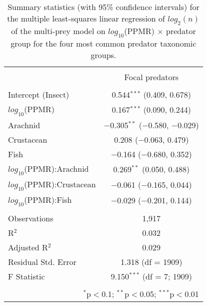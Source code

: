 
\begin{table}[!htbp] \centering 
  \caption{Summary statistics (with 95\% confidence intervals) for the multiple least-squares linear regression of $log_2(n)$ of the multi-prey model on $log_{10}$(PPMR) $\times$ predator group for the four most common predator taxonomic groups.} 
  \label{tab:n-ppmr_byPred} 
\begin{tabular}{@{\extracolsep{5pt}}lc} 
\\[-1.8ex]\hline 
\hline \\[-1.8ex] 
 & \multicolumn{1}{c}{Focal predators} \\ 
\cline{2-2} 
\hline \\[-1.8ex] 
 Intercept (Insect) & 0.544$^{***}$ (0.409, 0.678) \\ 
  $log_{10}$(PPMR) & 0.167$^{***}$ (0.090, 0.244) \\ 
  Arachnid & $-$0.305$^{**}$ ($-$0.580, $-$0.029) \\ 
  Crustacean & 0.208 ($-$0.063, 0.479) \\ 
  Fish & $-$0.164 ($-$0.680, 0.352) \\ 
  $log_{10}$(PPMR):Arachnid & 0.269$^{**}$ (0.050, 0.488) \\ 
  $log_{10}$(PPMR):Crustacean & $-$0.061 ($-$0.165, 0.044) \\ 
  $log_{10}$(PPMR):Fish & $-$0.029 ($-$0.201, 0.144) \\ 
 \hline \\[-1.8ex] 
Observations & 1,917 \\ 
R$^{2}$ & 0.032 \\ 
Adjusted R$^{2}$ & 0.029 \\ 
Residual Std. Error & 1.318 (df = 1909) \\ 
F Statistic & 9.150$^{***}$ (df = 7; 1909) \\ 
\hline 
\hline \\[-1.8ex] 
\multicolumn{2}{r}{$^{*}$p$<$0.1; $^{**}$p$<$0.05; $^{***}$p$<$0.01} \\ 
\end{tabular} 
\end{table} 
